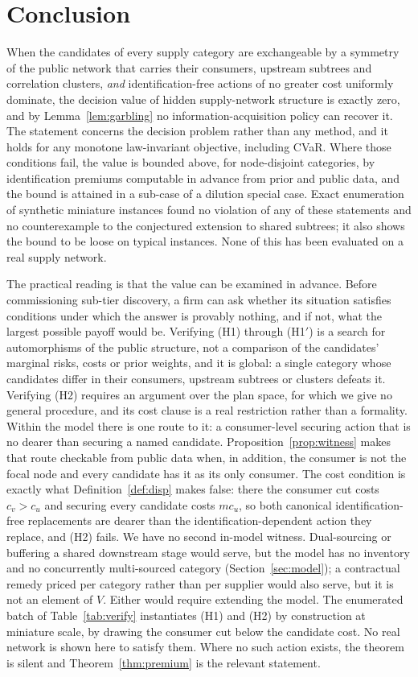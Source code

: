 \documentclass[pdflatex,sn-mathphys-num]{sn-jnl}
\theoremstyle{thmstyleone}
\theoremstyle{thmstyletwo}
\theoremstyle{thmstylethree}
\begin{document}
\section{Conclusion}\label{sec:concl}

When the candidates of every supply category are exchangeable by a symmetry
of the public network that carries their consumers, upstream subtrees and
correlation clusters, \emph{and} identification-free actions of no greater cost uniformly dominate, the
decision value of hidden supply-network structure is exactly zero, and by Lemma~\ref{lem:garbling} no
information-acquisition policy can recover it. The statement concerns the
decision problem rather than any method, and it holds for any monotone
law-invariant objective, including CVaR. Where those conditions fail, the
value is bounded above, for node-disjoint categories, by identification
premiums computable in advance from prior and public data, and the bound is attained in a sub-case of a dilution special case.
Exact enumeration of synthetic miniature instances found no violation of any
of these statements and no counterexample to the conjectured extension to
shared subtrees; it also shows the bound to be loose on typical instances.
None of this has been evaluated on a real supply network.

The practical reading is that the value can be examined in advance. Before commissioning sub-tier discovery, a
firm can ask whether its situation satisfies conditions under which the
answer is provably nothing, and if not, what the largest possible payoff
would be. Verifying (H1) through (H1$'$) is a search for automorphisms of the
public structure, not a comparison of the candidates' marginal risks, costs or
prior weights, and it is global: a single category whose candidates differ in
their consumers, upstream subtrees or clusters defeats it.
Verifying (H2) requires an argument over the plan space, for which we give no
general procedure, and its cost clause is a real restriction rather than a
formality. Within the model there is one route to it: a consumer-level
securing action that is no dearer than securing a named candidate.
Proposition~\ref{prop:witness} makes that route checkable from public data
when, in addition, the consumer is not the focal node and every candidate has
it as its only consumer.
The cost condition is exactly what Definition~\ref{def:disp} makes false:
there the consumer cut costs $c_v>c_u$ and securing every candidate costs
$mc_u$, so both canonical identification-free replacements are dearer than
the identification-dependent action they replace, and (H2) fails. We have no
second in-model witness. Dual-sourcing or buffering a shared downstream stage
would serve, but the model has no inventory and no concurrently
multi-sourced category (Section~\ref{sec:model}); a contractual remedy priced
per category rather than per supplier would also serve, but it is not an
element of $V$. Either would require extending the model. The enumerated
batch of Table~\ref{tab:verify} instantiates (H1) and (H2) by construction
at miniature scale, by drawing the consumer cut below the candidate cost. No
real network is shown here to satisfy them.
Where no such action exists, the theorem is silent and
Theorem~\ref{thm:premium} is the relevant statement.
\end{document}
